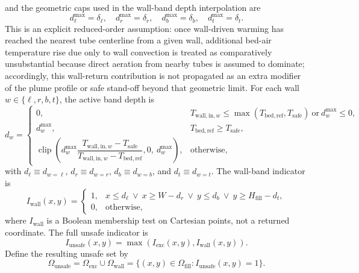 \documentclass[11pt]{article}
\begin{document}
and the geometric caps used in the wall-band depth interpolation are
\begin{equation}
\label{eq:wall_band_depth_limits}
d_{\ell}^{\max}=\delta_{\ell},\quad d_{r}^{\max}=\delta_r,\quad d_{b}^{\max}=\delta_b,\quad d_{t}^{\max}=\delta_t.
\end{equation}
This is an explicit reduced-order assumption: once wall-driven warming has reached the nearest tube centerline from a given wall, additional bed-air temperature rise due only to wall convection is treated as comparatively unsubstantial because direct aeration from nearby tubes is assumed to dominate; accordingly, this wall-return contribution is not propagated as an extra modifier of the plume profile or safe stand-off beyond that geometric limit.
For each wall \(w\in\{\ell,r,b,t\}\), the active band depth is
\begin{equation}
\label{eq:wall_band_depth_from_wall_temp}
d_w=
\begin{cases}
0, & T_{\mathrm{wall,in},w}\le \max\!\left(T_{\mathrm{bed,ref}},T_{\mathrm{safe}}\right)\ \text{or}\ d_w^{\max}\le 0,\\
d_w^{\max}, & T_{\mathrm{bed,ref}}\ge T_{\mathrm{safe}},\\
\operatorname{clip}\!\left(
 d_w^{\max}\dfrac{T_{\mathrm{wall,in},w}-T_{\mathrm{safe}}}
 {T_{\mathrm{wall,in},w}-T_{\mathrm{bed,ref}}},
 0,\ d_w^{\max}
\right), & \text{otherwise},
\end{cases}
\end{equation}
with \(d_{\ell}\equiv d_{w=\ell}\), \(d_r\equiv d_{w=r}\), \(d_b\equiv d_{w=b}\), and \(d_t\equiv d_{w=t}\).
The wall-band indicator is
\begin{equation}
\label{eq:wall_band_indicator}
I_{\mathrm{wall}}(x,y)=
\begin{cases}
1, & x\le d_{\ell}\ \lor\ x\ge W-d_r\ \lor\ y\le d_b\ \lor\ y\ge H_{\mathrm{fill}}-d_t,\\
0, & \text{otherwise},
\end{cases}
\end{equation}
where \(I_{\mathrm{wall}}\) is a Boolean membership test on Cartesian points, not a returned coordinate.
The full unsafe indicator is
\begin{equation}
\label{eq:unsafe_set_indicator}
I_{\mathrm{unsafe}}(x,y)=\max\!\left(I_{\mathrm{exc}}(x,y),I_{\mathrm{wall}}(x,y)\right).
\end{equation}
Define the resulting unsafe set by
\[
\Omega_{\mathrm{unsafe}}=\Omega_{\mathrm{exc}}\cup\Omega_{\mathrm{wall}}=\{(x,y)\in\Omega_{\mathrm{fill}}:I_{\mathrm{unsafe}}(x,y)=1\}.
\]
\end{document}
